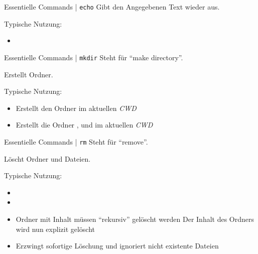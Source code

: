 \documentclass{setbeamer}
\begin{document}
\begin{frame}{Essentielle Commands | \texttt{echo}}
    Gibt den Angegebenen Text wieder aus.

    \vspace{0.3cm}

    Typische Nutzung:
    \begin{itemize}
        \item {}
    \end{itemize}
\end{frame}

\begin{frame}{Essentielle Commands | \texttt{mkdir}}
    Steht für ``make directory''.

    \vspace{0.3cm}

    Erstellt Ordner.

    \vspace{0.3cm}

    Typische Nutzung:
    \begin{itemize}
        \item {}\textemdash Erstellt den Ordner  im aktuellen \emph{CWD}
        \item {}\textemdash Erstellt die Ordner ,  und  im aktuellen \emph{CWD}
    \end{itemize}
\end{frame}

\begin{frame}{Essentielle Commands | \texttt{rm}}
    Steht für ``remove''.

    \vspace{0.3cm}

    Löscht Ordner und Dateien.

    \vspace{0.3cm}

    Typische Nutzung:
    \begin{itemize}
        \item {}
        \item {}
        \item {}\textemdash Ordner mit Inhalt müssen ``rekursiv'' gelöscht werden {\Large \MVRightarrow} Der Inhalt des Ordners wird nun explizit gelöscht
        \item {}\textemdash Erzwingt sofortige Löschung und ignoriert nicht existente Dateien
    \end{itemize}
\end{frame}
\end{document}
